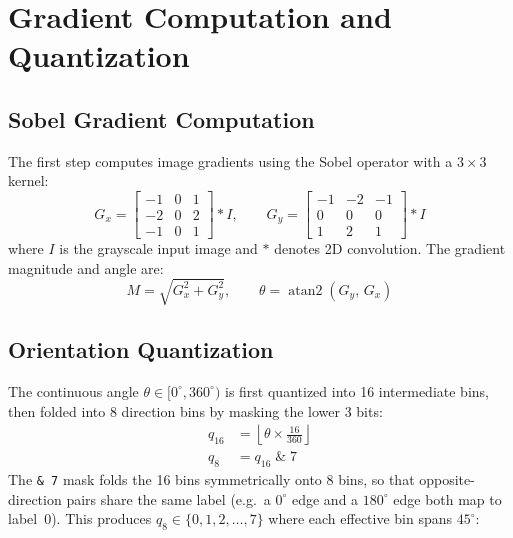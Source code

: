 \documentclass[12pt,a4paper]{article}
\begin{document}
\section{Gradient Computation and Quantization}

\subsection{Sobel Gradient Computation}
The first step computes image gradients using the Sobel operator with a $3\times 3$
kernel:
\begin{equation}
  G_x = \begin{bmatrix} -1 & 0 & 1 \\ -2 & 0 & 2 \\ -1 & 0 & 1 \end{bmatrix} * I,
  \qquad
  G_y = \begin{bmatrix} -1 & -2 & -1 \\ 0 & 0 & 0 \\ 1 & 2 & 1 \end{bmatrix} * I
\end{equation}
where $I$ is the grayscale input image and $*$ denotes 2D convolution.  The gradient
magnitude and angle are:
\begin{equation}
  M = \sqrt{G_x^2 + G_y^2},
  \qquad
  \theta = \operatorname{atan2}(G_y,\, G_x)
\end{equation}

\subsection{Orientation Quantization}
The continuous angle $\theta \in [0^\circ, 360^\circ)$ is first quantized into
16 intermediate bins, then folded into 8 direction bins by masking the lower 3
bits:
\begin{align}
  q_{16} &= \left\lfloor \theta \times \frac{16}{360} \right\rfloor \\
  q_8    &= q_{16} \;\&\; 7
\end{align}
The \texttt{\&\,7} mask folds the 16 bins symmetrically onto 8 bins, so that
opposite-direction pairs share the same label (e.g.\ a $0^\circ$ edge and a
$180^\circ$ edge both map to label~0).  This produces
$q_8 \in \{0, 1, 2, \ldots, 7\}$ where each effective bin spans $45^\circ$:
\end{document}
